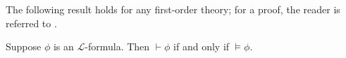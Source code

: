 The following result holds for any first-order theory; for a proof, the reader is referred to 
\cite{shoenfield1967mathematical}.

\begin{theorem}
    \label{thm:completeness}
    \leanok
    Suppose $\phi$ is an $\mathcal{L}$-formula.
    Then $\vdash \phi$ if and only if $\vDash \phi$.
\end{theorem}